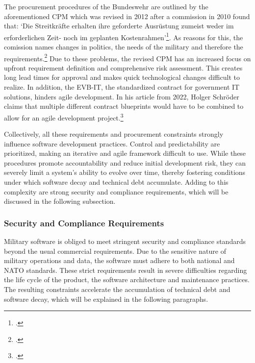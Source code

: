 The procurement procedures of the Bundeswehr are outlined by the aforementioned \ac{CPM} which was revised in 2012 after a commission in 2010 found that: 
`Die Streitkräfte erhalten ihre geforderte Ausrüstung zumeist weder im erforderlichen Zeit- noch im geplanten Kostenrahmen'\footcite[36]{strukturkommissionderbundeswehrBerichtStrukturkommissionBundeswehr2010}.
As reasons for this, the comission names changes in politics, the needs of the military and therefore the requirements.\footcite[36]{strukturkommissionderbundeswehrBerichtStrukturkommissionBundeswehr2010}
Due to these problems, the revised \ac{CPM} has an increased focus on upfront requirement definition and comprehensive risk assessment. This creates long lead times
for approval and makes quick technological changes difficult to realize.
In addition, the \ac{EVB-IT}, the standardized contract for government IT solutions, hinders agile development. In his article from 2022,
Holger Schröder claims that multiple different contract blueprints would have to be combined to allow for an agile development project.\footcite[no page number]{schroederUngeeignetFuerAgile2022}

Collectively, all these requirements and procurement constraints strongly influence software development practices. Control and predictability are prioritized, making
an iterative and agile framework difficult to use. While these procedures promote accountability and reduce initial development risk, they can severely limit a system's ability to evolve over time, thereby fostering conditions under which software decay and technical debt accumulate. 
Adding to this complexity are strong security and compliance requirements, which will be discussed in the following subsection.

\subsubsection{Security and Compliance Requirements}
Military software is obliged to meet stringent security and compliance standards beyond the usual commercial requirements. Due to the sensitive nature of military operations and data,
the software must adhere to both national and NATO standards. These strict requirements result in severe difficulties 
regarding the life cycle of the product, the software architecture and maintenance practices. The resulting constraints accelerate the accumulation of technical debt and software decay, which will be explained in the following paragraphs.

